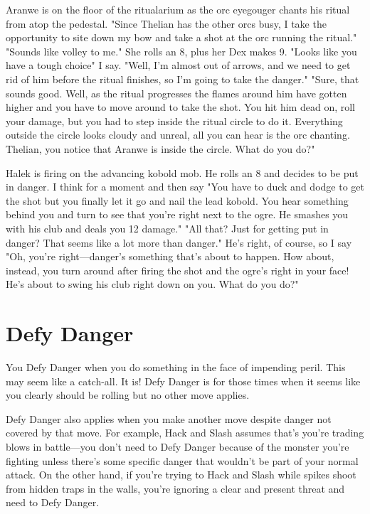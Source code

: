        
\startExample
Aranwe is on the floor of the ritualarium as the orc eyegouger chants his ritual from atop the pedestal. "Since Thelian has the other orcs busy, I take the opportunity to site down my bow and take a shot at the orc running the ritual." "Sounds like volley to me." She rolls an 8, plus her Dex makes 9. "Looks like you have a tough choice" I say. "Well, I'm almost out of arrows, and we need to get rid of him before the ritual finishes, so I'm going to take the danger." "Sure, that sounds good. Well, as the ritual progresses the flames around him have gotten higher and you have to move around to take the shot. You hit him dead on, roll your damage, but you had to step inside the ritual circle to do it. Everything outside the circle looks cloudy and unreal, all you can hear is the orc chanting. Thelian, you notice that Aranwe is inside the circle. What do you do?"
\stopExample
       
\startExample
Halek is firing on the advancing kobold mob. He rolls an 8 and decides to be put in danger. I think for a moment and then say "You have to duck and dodge to get the shot but you finally let it go and nail the lead kobold. You hear something behind you and turn to see that you're right next to the ogre. He smashes you with his club and deals you 12 damage." "All that? Just for getting put in danger? That seems like a lot more than danger." He's right, of course, so I say "Oh, you're right—danger's something that's about to happen. How about, instead, you turn around after firing the shot and the ogre's right in your face! He's about to swing his club right down on you. What do you do?"
\stopExample
       
\section{Defy Danger}    
       

You Defy Danger when you do something in the face of impending peril. This may seem like a catch-all. It is! Defy Danger is for those times when it seems like you clearly should be rolling but no other move applies.

       

Defy Danger also applies when you make another move despite danger not covered by that move. For example, Hack and Slash assumes that's you're trading blows in battle—you don't need to Defy Danger because of the monster you're fighting unless there's some specific danger that wouldn't be part of your normal attack. On the other hand, if you're trying to Hack and Slash while spikes shoot from hidden traps in the walls, you're ignoring a clear and present threat and need to Defy Danger.

